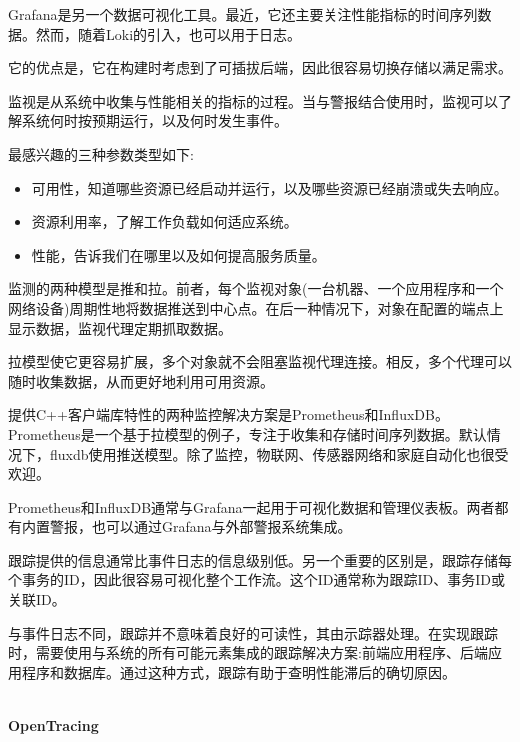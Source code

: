 Grafana是另一个数据可视化工具。最近，它还主要关注性能指标的时间序列数据。然而，随着Loki的引入，也可以用于日志。

它的优点是，它在构建时考虑到了可插拔后端，因此很容易切换存储以满足需求。


监视是从系统中收集与性能相关的指标的过程。当与警报结合使用时，监视可以了解系统何时按预期运行，以及何时发生事件。

最感兴趣的三种参数类型如下:

\begin{itemize}
\item 
可用性，知道哪些资源已经启动并运行，以及哪些资源已经崩溃或失去响应。

\item 
资源利用率，了解工作负载如何适应系统。

\item 
性能，告诉我们在哪里以及如何提高服务质量。
\end{itemize}

监测的两种模型是推和拉。前者，每个监视对象(一台机器、一个应用程序和一个网络设备)周期性地将数据推送到中心点。在后一种情况下，对象在配置的端点上显示数据，监视代理定期抓取数据。

拉模型使它更容易扩展，多个对象就不会阻塞监视代理连接。相反，多个代理可以随时收集数据，从而更好地利用可用资源。

提供C++客户端库特性的两种监控解决方案是Prometheus和InfluxDB。Prometheus是一个基于拉模型的例子，专注于收集和存储时间序列数据。默认情况下，fluxdb使用推送模型。除了监控，物联网、传感器网络和家庭自动化也很受欢迎。

Prometheus和InfluxDB通常与Grafana一起用于可视化数据和管理仪表板。两者都有内置警报，也可以通过Grafana与外部警报系统集成。


跟踪提供的信息通常比事件日志的信息级别低。另一个重要的区别是，跟踪存储每个事务的ID，因此很容易可视化整个工作流。这个ID通常称为跟踪ID、事务ID或关联ID。

与事件日志不同，跟踪并不意味着良好的可读性，其由示踪器处理。在实现跟踪时，需要使用与系统的所有可能元素集成的跟踪解决方案:前端应用程序、后端应用程序和数据库。通过这种方式，跟踪有助于查明性能滞后的确切原因。

\hspace*{\fill} \\ %
\noindent
\textbf{OpenTracing}

